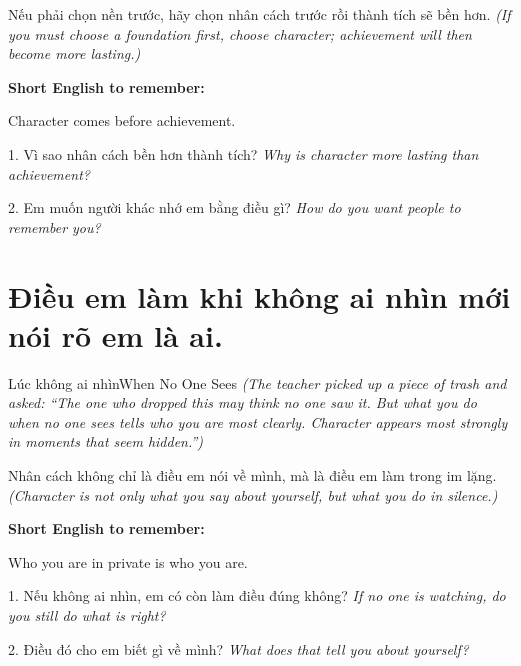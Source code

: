 \begin{baihoc}
Nếu phải chọn nền trước, hãy chọn nhân cách trước rồi thành tích sẽ bền hơn.
\textit{(If you must choose a foundation first, choose character; achievement will then become more lasting.)}
\end{baihoc}

\begin{ghinhoanh}
\textbf{Short English to remember:}

Character comes before achievement.

\end{ghinhoanh}

\begin{tuhocnhanh}
1. Vì sao nhân cách bền hơn thành tích? \textit{Why is character more lasting than achievement?}

2. Em muốn người khác nhớ em bằng điều gì? \textit{How do you want people to remember you?}
\end{tuhocnhanh}
\ngancach

\section{Điều em làm khi không ai nhìn mới nói rõ em là ai.}
\begin{truyen}{Lúc không ai nhìn}{When No One Sees}
\textit{(The teacher picked up a piece of trash and asked: ``The one who dropped this may think no one saw it. But what you do when no one sees tells who you are most clearly. Character appears most strongly in moments that seem hidden.'')}
\end{truyen}

\begin{baihoc}
Nhân cách không chỉ là điều em nói về mình, mà là điều em làm trong im lặng.
\textit{(Character is not only what you say about yourself, but what you do in silence.)}
\end{baihoc}

\begin{ghinhoanh}
\textbf{Short English to remember:}

Who you are in private is who you are.

\end{ghinhoanh}

\begin{tuhocnhanh}
1. Nếu không ai nhìn, em có còn làm điều đúng không? \textit{If no one is watching, do you still do what is right?}

2. Điều đó cho em biết gì về mình? \textit{What does that tell you about yourself?}
\end{tuhocnhanh}
\ngancach

